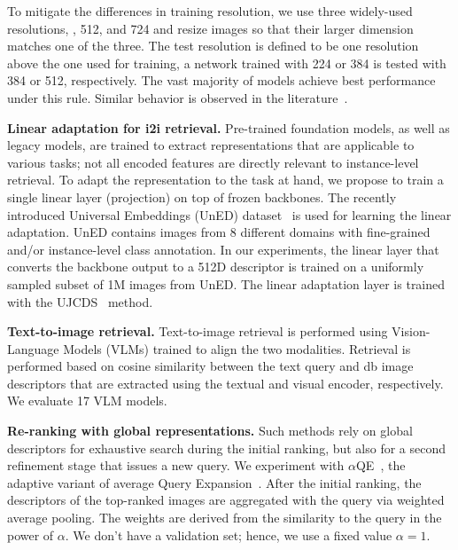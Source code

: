 To mitigate the differences in training resolution, we use three widely-used resolutions, , 512, and 724 and resize images so that their larger dimension matches one of the three.
The test resolution is defined to be one resolution above the one used for training, \eg a network trained with 224 or 384 is tested with 384 or 512, respectively.
The vast majority of models achieve best performance under this rule. Similar behavior is observed in the literature~\cite{tvd+19,st23}.

\noindent\textbf{Linear adaptation for i2i retrieval.} Pre-trained foundation models, as well as legacy models, are trained to extract representations that are applicable to various tasks; not all encoded features are directly relevant to instance-level retrieval.
To adapt the representation to the task at hand, we propose to train a single linear layer (projection) on top of frozen backbones.
The recently introduced Universal Embeddings (UnED) dataset~\cite{ycc+23} is used for learning the linear adaptation. 
UnED contains images from 8 different domains with fine-grained and/or instance-level class annotation.
In our experiments, the linear layer that converts the backbone output to a 512D descriptor is trained on a uniformly sampled subset of 1M images from UnED.
The linear adaptation layer is trained with the UJCDS~\cite{ycc+23} method. 

\noindent\textbf{Text-to-image retrieval.}
Text-to-image retrieval is performed using Vision-Language Models (VLMs) trained to align the two modalities. 
Retrieval is performed based on cosine similarity between the text query and db image descriptors that are extracted using the textual and visual encoder, respectively.
We evaluate 17 VLM models.

\noindent\textbf{Re-ranking with global representations.} Such methods rely on global descriptors for exhaustive search during the initial ranking, but also for a second refinement stage that issues a new query.
We experiment with $\alpha$QE~\cite{rtc19}, the adaptive variant of average Query Expansion~\cite{cps+07}. After the initial ranking, the descriptors of the top-ranked images are aggregated with the query via weighted average pooling.
The weights are derived from the similarity to the query in the power of $\alpha$. We don't have a validation set; hence, we use a fixed value $\alpha=1$.

